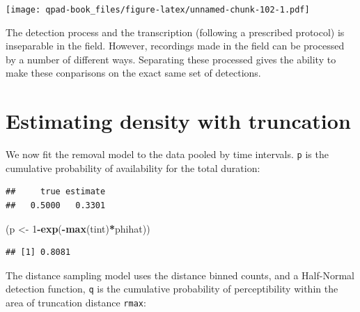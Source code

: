 \documentclass[12pt,]{book}
\newenvironment{Shaded}{\begin{snugshade}}{\end{snugshade}}
\newcommand{\DataTypeTok}[1]{\textcolor[rgb]{0.13,0.29,0.53}{#1}}
\newcommand{\DecValTok}[1]{\textcolor[rgb]{0.00,0.00,0.81}{#1}}
\newcommand{\KeywordTok}[1]{\textcolor[rgb]{0.13,0.29,0.53}{\textbf{#1}}}
\newcommand{\NormalTok}[1]{#1}
\newcommand{\OperatorTok}[1]{\textcolor[rgb]{0.81,0.36,0.00}{\textbf{#1}}}
\newcommand{\StringTok}[1]{\textcolor[rgb]{0.31,0.60,0.02}{#1}}
\begin{document}
\texttt{[image: qpad-book\_files/figure-latex/unnamed-chunk-102-1.pdf]}

The detection process and the transcription (following a prescribed
protocol) is inseparable in the field. However, recordings
made in the field can be processed by a number of different ways.
Separating these processed gives the ability to make these
conparisons on the exact same set of detections.

\hypertarget{estimating-density-with-truncation}{%
\section{Estimating density with truncation}\label{estimating-density-with-truncation}}

We now fit the removal model to the data pooled by time intervals.
\texttt{p} is the cumulative probability of availability for the total duration:

\begin{Shaded}
\end{Shaded}

\begin{verbatim}
##     true estimate 
##   0.5000   0.3301
\end{verbatim}

\begin{Shaded}
\begin{Highlighting}[]
\NormalTok{(p <-}\StringTok{ }\DecValTok{1}\OperatorTok{-}\KeywordTok{exp}\NormalTok{(}\OperatorTok{-}\KeywordTok{max}\NormalTok{(tint)}\OperatorTok{*}\NormalTok{phihat))}
\end{Highlighting}
\end{Shaded}

\begin{verbatim}
## [1] 0.8081
\end{verbatim}

The distance sampling model uses the distance binned counts,
and a Half-Normal detection function, \texttt{q} is the cumulative
probability of perceptibility within the area of
truncation distance \texttt{rmax}:
\end{document}
